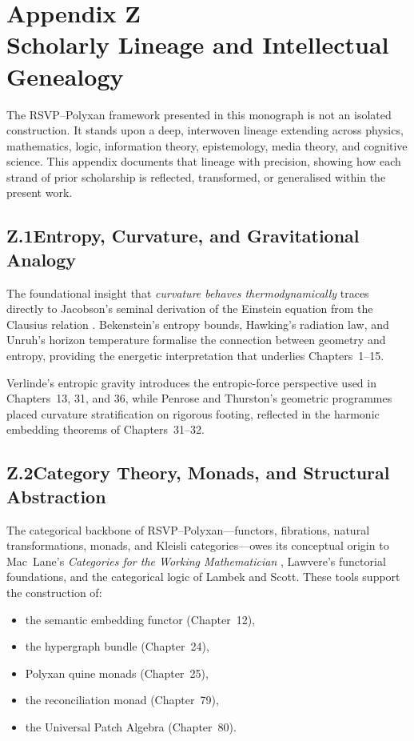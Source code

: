\chapter*{Appendix Z\\Scholarly Lineage and Intellectual Genealogy}

The RSVP--Polyxan framework presented in this monograph is not an isolated construction.
It stands upon a deep, interwoven lineage extending across physics, mathematics, logic,
information theory, epistemology, media theory, and cognitive science.
This appendix documents that lineage with precision, showing how each strand of prior
scholarship is reflected, transformed, or generalised within the present work.

\section*{Z.1\quad Entropy, Curvature, and Gravitational Analogy}
The foundational insight that \emph{curvature behaves thermodynamically} traces directly
to Jacobson's seminal derivation of the Einstein equation from the Clausius relation
\cite{jacobson1995thermodynamics}.  
Bekenstein's entropy bounds, Hawking's radiation law, and Unruh's horizon temperature
formalise the connection between geometry and entropy, providing the energetic
interpretation that underlies Chapters~1--15.

Verlinde's entropic gravity \cite{verlinde2011origins} introduces the entropic-force
perspective used in Chapters~13, 31, and 36, while Penrose and Thurston's geometric
programmes placed curvature stratification on rigorous footing, reflected in the
harmonic embedding theorems of Chapters~31--32.

\section*{Z.2\quad Category Theory, Monads, and Structural Abstraction}
The categorical backbone of RSVP--Polyxan---functors, fibrations, natural
transformations, monads, and Kleisli categories---owes its conceptual origin to
Mac~Lane's \emph{Categories for the Working Mathematician} \cite{maclane1971categories},
Lawvere's functorial foundations, and the categorical logic of Lambek and Scott.
These tools support the construction of:
\begin{itemize}
    \item the semantic embedding functor (Chapter~12),
    \item the hypergraph bundle (Chapter~24),
    \item Polyxan quine monads (Chapter~25),
    \item the reconciliation monad (Chapter~79),
    \item the Universal Patch Algebra (Chapter~80).
\end{itemize}

